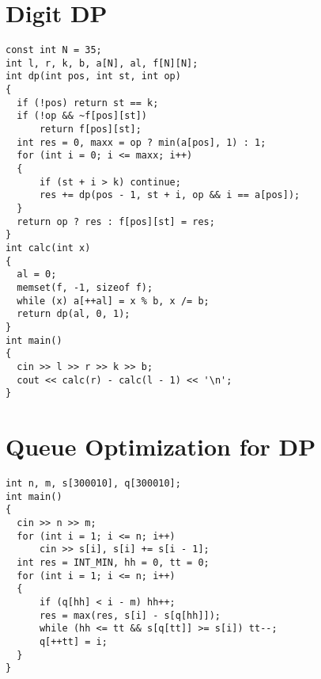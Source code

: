 \section{Digit DP}
\begin{lstlisting}
const int N = 35;
int l, r, k, b, a[N], al, f[N][N];
int dp(int pos, int st, int op)
{
  if (!pos) return st == k;
  if (!op && ~f[pos][st])
      return f[pos][st];
  int res = 0, maxx = op ? min(a[pos], 1) : 1;
  for (int i = 0; i <= maxx; i++)
  {
      if (st + i > k) continue;
      res += dp(pos - 1, st + i, op && i == a[pos]);
  }
  return op ? res : f[pos][st] = res;
}
int calc(int x)
{
  al = 0;
  memset(f, -1, sizeof f);
  while (x) a[++al] = x % b, x /= b;
  return dp(al, 0, 1);
}
int main()
{
  cin >> l >> r >> k >> b;
  cout << calc(r) - calc(l - 1) << '\n';
}
\end{lstlisting}
\section{Queue Optimization for DP}
\begin{lstlisting}
int n, m, s[300010], q[300010];
int main()
{
  cin >> n >> m;
  for (int i = 1; i <= n; i++)
      cin >> s[i], s[i] += s[i - 1];
  int res = INT_MIN, hh = 0, tt = 0;
  for (int i = 1; i <= n; i++)
  {
      if (q[hh] < i - m) hh++;
      res = max(res, s[i] - s[q[hh]]);
      while (hh <= tt && s[q[tt]] >= s[i]) tt--;
      q[++tt] = i;
  }
}
\end{lstlisting}
